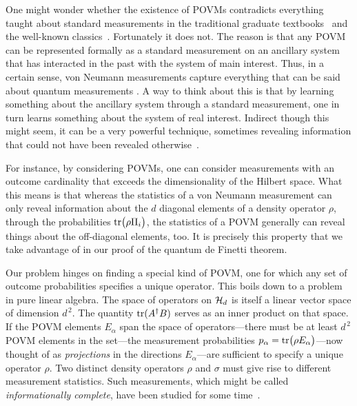 One might wonder whether the existence of POVMs contradicts
everything taught about standard measurements in the traditional
graduate textbooks~\cite{QuantumClassics1} and the well-known
classics~\cite{QuantumClassics2}. Fortunately it does not. The
reason is that any POVM can be represented formally as a standard
measurement on an ancillary system that has interacted in the past
with the system of main interest.  Thus, in a certain sense, von
Neumann measurements capture everything that can be said about
quantum measurements \cite{Kraus1983}. A way to think about this
is that by learning something about the ancillary system through a
standard measurement, one in turn learns something about the
system of real interest. Indirect though this might seem, it can
be a very powerful technique, sometimes revealing information that
could not have been revealed otherwise~\cite{Holevo1973}.

For instance, by considering POVMs, one can consider measurements
with an outcome cardinality that exceeds the dimensionality of the
Hilbert space. What this means is that whereas the statistics of a
von Neumann measurement can only reveal information about the $d$
diagonal elements of a density operator $\rho$, through the
probabilities ${\rm tr}\big(\rho\Pi_i\big)$, the statistics of a
POVM generally can reveal things about the off-diagonal elements,
too. It is precisely this property that we take advantage of in our
proof of the quantum de Finetti theorem.

Our problem hinges on finding a special kind of POVM, one for
which any set of outcome probabilities specifies a unique
operator.  This boils down to a problem in pure linear algebra.
The space of operators on ${\cal H}_d$ is itself a linear vector
space of dimension $d^{\,2}$. The quantity ${\rm tr}(A^\dagger B)$
serves as an inner product on that space. If the POVM elements
$E_\alpha$ span the space of operators---there must be at least
$d^{\,2}$ POVM elements in the set---the measurement probabilities
$p_\alpha={\rm tr}\big(\rho E_\alpha\big)$---now thought of as
{\it projections\/} in the directions $E_\alpha$---are sufficient
to specify a unique operator $\rho$.  Two distinct density
operators $\rho$ and $\sigma$ must give rise to different
measurement statistics. Such measurements, which might be called
{\it informationally complete}, have been studied for some
time~\cite{Prugovecki1977}.


